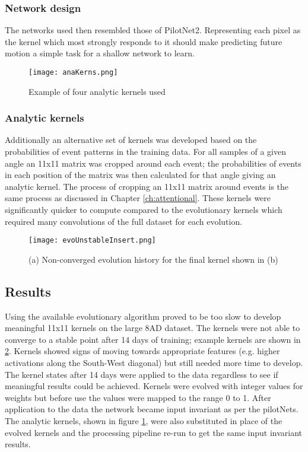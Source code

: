 \subsubsection{Network design} 
The networks used then resembled those of PilotNet2.
Representing each pixel as the kernel which most strongly responds to it should make predicting future motion a simple task for a shallow network to learn.

\begin{figure}
    \centering
    \texttt{[image: anaKerns.png]}
    \caption{Example of four analytic kernels used}
    \label{fig:anaKerns}
\end{figure}

\subsubsection{Analytic kernels}
Additionally an alternative set of kernels was developed based on the probabilities of event patterns in the training data.
For all samples of a given angle an 11x11 matrix was cropped around each event; the probabilities of events in each position of the matrix was then calculated for that angle giving an analytic kernel.
The process of cropping an 11x11 matrix around events is the same process as discussed in Chapter \ref{ch:attentional}.
These kernels were significantly quicker to compute compared to the evolutionary kernels which required many convolutions of the full dataset for each evolution. 


\begin{figure}[h]
    \centering
    \texttt{[image: evoUnstableInsert.png]}
    \caption{(a) Non-converged evolution history for the final kernel shown in (b)}
    \label{fig:evoUnstableInsert}
\end{figure}

\subsection{Results}
Using the available evolutionary algorithm proved to be too slow to develop meaningful 11x11 kernels on the large 8AD dataset.
The kernels were not able to converge to a stable point after 14 days of training; example kernels are shown in \ref{fig:evoUnstableInsert}.
Kernels showed signs of moving towards appropriate features (e.g. higher activations along the South-West diagonal) but still needed more time to develop. 
The kernel states after 14 days were applied to the data regardless to see if meaningful results could be achieved. 
Kernels were evolved with integer values for weights but before use the values were mapped to the range 0 to 1.
After application to the data the network became input invariant as per the pilotNets. 
The analytic kernels, shown in figure \ref{fig:anaKerns}, were also substituted in place of the evolved kernels and the processing pipeline re-run to get the same input invariant results. 


